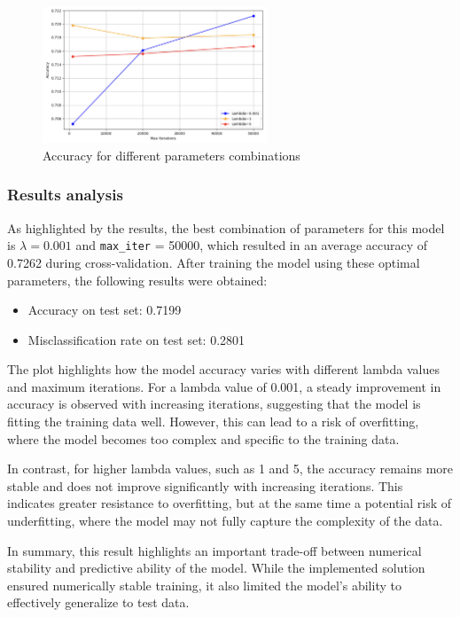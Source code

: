 \documentclass[a4paper, 10pt]{article}
\begin{document}
\begin{figure}[H]
    \centering
    \includegraphics[width=0.6\textwidth]{images/accLOG.png}
    \caption{Accuracy for different parameters combinations}
    \label{fig:accLOG}
\end{figure}

\subsubsection{Results analysis}
As highlighted by the results, the best combination of parameters for this model is \(\lambda = 0.001\) and \texttt{max\_iter} = 50000, which resulted in an average accuracy of 0.7262 during cross-validation. After training the model using these optimal parameters, the following results were obtained:
\begin{itemize}
    \item Accuracy on test set: 0.7199
    \item Misclassification rate on test set: 0.2801
\end{itemize}

The plot highlights how the model accuracy varies with different lambda values and maximum iterations. For a lambda value of 0.001, a steady improvement in accuracy is observed with increasing iterations, suggesting that the model is fitting the training data well. However, this can lead to a risk of overfitting, where the model becomes too complex and specific to the training data.

In contrast, for higher lambda values, such as 1 and 5, the accuracy remains more stable and does not improve significantly with increasing iterations. This indicates greater resistance to overfitting, but at the same time a potential risk of underfitting, where the model may not fully capture the complexity of the data.

\vspace{0.5cm}

In summary, this result highlights an important trade-off between numerical stability and predictive ability of the model. While the implemented solution ensured numerically stable training, it also limited the model's ability to effectively generalize to test data.
\end{document}
